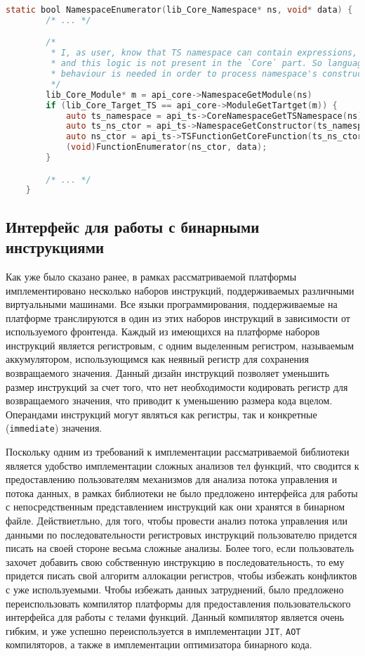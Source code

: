 \begin{lstlisting}[language=C, label=lst:getTsNamespace]
    static bool NamespaceEnumerator(lib_Core_Namespace* ns, void* data) {
        /* ... */

        /*
         * I, as user, know that TS namespace can contain expressions,
         * and this logic is not present in the `Core` part. So language-specific
         * behaviour is needed in order to process namespace's constructor.
         */
        lib_Core_Module* m = api_core->NamespaceGetModule(ns)
        if (lib_Core_Target_TS == api_core->ModuleGetTartget(m)) {
            auto ts_namespace = api_ts->CoreNamespaceGetTSNamespace(ns);
            auto ts_ns_ctor = api_ts->NamespaceGetConstructor(ts_namespace);
            auto ns_ctor = api_ts->TSFunctionGetCoreFunction(ts_ns_ctor);
            (void)FunctionEnumerator(ns_ctor, data);
        }

        /* ... */
    }
\end{lstlisting}


\subsection{Интерфейс для работы с бинарными инструкциями}

Как уже было сказано ранее, в рамках рассматриваемой платформы имплементировано несколько наборов инструкций, поддерживаемых различными виртуальными машинами. Все языки программирования, поддерживаемые на платформе транслируются в один из этих наборов инструкций в зависимости от используемого фронтенда. Каждый из имеющихся на платформе наборов инструкций является регистровым, с одним выделенным регистром, называемым аккумулятором, использующимся как неявный регистр для сохранения возвращаемого значения. Данный дизайн инструкций позволяет уменьшить размер инструкций за счет того, что нет необходимости кодировать регистр для возвращаемого значения, что приводит к уменьшению размера кода вцелом. Операндами инструкций могут являться как регистры, так и конкретные (\texttt{immediate}) значения.

Поскольку одним из требований к имплементации рассматриваемой библиотеки является удобство имплементации сложных анализов тел функций, что сводится к предоставлению пользователям механизмов для анализа потока управления и потока данных, в рамках библиотеки не было предложено интерфейса для работы с непосредственным представлением инструкций как они хранятся в бинарном файле. Действиетльно, для того, чтобы провести анализ потока управления или данными по последовательности регистровых инструкций пользователю придется писать на своей стороне весьма сложные анализы. Более того, если пользователь захочет добавить свою собственную инструкцию в последовательность, то ему придется писать свой алгоритм аллокации регистров, чтобы избежать конфликтов с уже используемыми. Чтобы избежать данных затруднений, было предложено переиспользовать компилятор платформы для предоставления пользовательского интерфейса для работы с телами функций. Данный компилятор является очень гибким, и уже успешно переиспользуется в имплементации \texttt{JIT}, \texttt{AOT} компиляторов, а также в имплементации оптимизатора бинарного кода.

